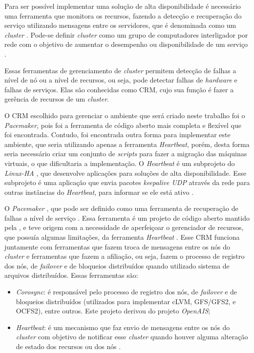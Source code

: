 Para ser possível implementar uma solução de alta disponibilidade é necessário uma ferramenta que monitora os recursos, fazendo a detecção e
recuperação do serviço utilizando mensagens entre os servidores, que é denominada como um \textit{cluster} \cite{perkov2011}. 
Pode-se definir \textit{cluster} como um grupo de computadores interligador por rede com o objetivo de aumentar o desempenho ou disponibilidade
de um serviço \cite{freitas2005}.

Essas ferramentas de gerenciamento de \textit{cluster} permitem detecção de falhas a nível de nó ou a nível de recursos, ou seja, pode detectar
falhas de \textit{hardware} e falhas de serviços.
Elas são conhecidas como \ac{CRM}, cujo sua função é fazer a gerência de recursos de um \textit{cluster}.

O \ac{CRM} escolhido para gerenciar o ambiente que será criado neste trabalho foi o \textit{Pacemaker}, pois foi a ferramenta de código aberto
mais completa e flexível que foi encontrada. Contudo, foi encontrada outra forma para implementar este ambiente, que seria utilizando apenas a 
ferramenta \textit{Heartbeat}, porém, desta forma seria necessário criar um conjunto de \textit{scripts} para fazer a migração das máquinas 
virtuais, o que dificultaria a implementação.
O \textit{Heartbeat} é um subprojeto do \textit{Linux-HA} \cite{linuxha}, que desenvolve aplicações para soluções de alta disponibilidade.
Esse subprojeto é uma aplicação que envia pacotes \textit{keepalive \ac{UDP}} através da rede para outras instâncias do \textit{Heartbeat}, para
informar se ele está ativo \cite{reis2009}.

O \textit{Pacemaker} \cite{pacemaker}, que pode ser definido como uma ferramenta de recuperação de falhas a nível de serviço \cite{perkov2011}. 
Essa ferramenta é um projeto de código aberto mantido pela \cite{clusterlabs}, e teve origem com a necessidade de aperfeiçoar o gerenciador 
de recursos, que possuía algumas limitações, da ferramenta \textit{Heartbeat} \cite{heartbeat}. Esse \ac{CRM} funciona juntamente com ferramentas
que fazem troca de mensagens entre os nós do \textit{cluster} e ferramentas que fazem a afiliação, ou seja, fazem o processo de registro dos
nós, de \textit{failover} e de bloqueios distribuídos quando utilizado sistema de arquivos distribuídos. Essas ferramentas são:

\begin{itemize}
 \item \textit{Corosync}: é responsável pelo processo de registro dos nós, de \textit{failover} e de bloqueios distribuídos (utilizados para 
 implementar cLVM, GFS/GFS2, e OCFS2), entre outros. Este projeto derivou do projeto \textit{OpenAIS};
 \item \textit{Heartbeat}: é um mecanismo que faz envio de mensagens entre os nós do \textit{cluster} com objetivo de notificar esse 
 \textit{cluster} quando houver alguma alteração de estado dos recursos ou dos nós \cite{clusterlabs}.
\end{itemize}

